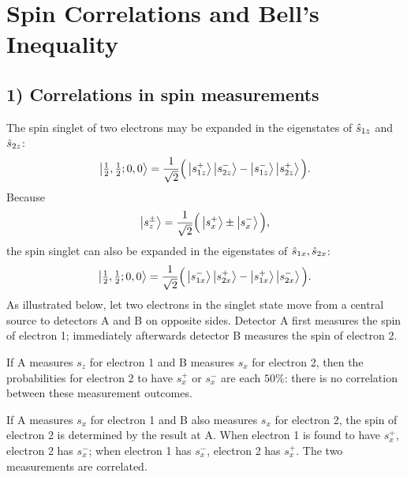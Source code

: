 \section{Spin Correlations and Bell's Inequality}
\subsection*{1) Correlations in spin measurements}
The spin singlet of two electrons may be expanded in the eigenstates of $\hat{s}_{1z}$ and $\hat{s}_{2z}$:
\begin{equation}
\left|\tfrac12,\tfrac12;0,0\right\rangle
=\frac1{\sqrt2}\Big(\left|s_{1z}^+\right\rangle\left|s_{2z}^-\right\rangle
-\left|s_{1z}^-\right\rangle\left|s_{2z}^+\right\rangle\Big).
\end{equation}
Because
\begin{equation}
\left|s_z^\pm\right\rangle=\frac1{\sqrt2}\Big(\left|s_x^+\right\rangle\pm\left|s_x^-\right\rangle\Big),
\end{equation}
the spin singlet can also be expanded in the eigenstates of $\hat{s}_{1x},\hat{s}_{2x}$:
\begin{equation}
\left|\tfrac12,\tfrac12;0,0\right\rangle
=\frac1{\sqrt2}\Big(\left|s_{1x}^-\right\rangle\left|s_{2x}^+\right\rangle
-\left|s_{1x}^+\right\rangle\left|s_{2x}^-\right\rangle\Big).
\end{equation}
As illustrated below, let two electrons in the singlet state move from a central source to detectors A and B on opposite sides. Detector A first measures the spin of electron 1; immediately afterwards detector B measures the spin of electron 2.
\begin{center}
\end{center}
If A measures $s_z$ for electron 1 and B measures $s_x$ for electron 2, then the probabilities for electron 2 to have $s_x^+$ or $s_x^-$ are each $50\%$: there is no correlation between these measurement outcomes.

If A measures $s_x$ for electron 1 and B also measures $s_x$ for electron 2, the spin of electron 2 is determined by the result at A. When electron 1 is found to have $s_x^+$, electron 2 has $s_x^-$; when electron 1 has $s_x^-$, electron 2 has $s_x^+$. The two measurements are correlated.

